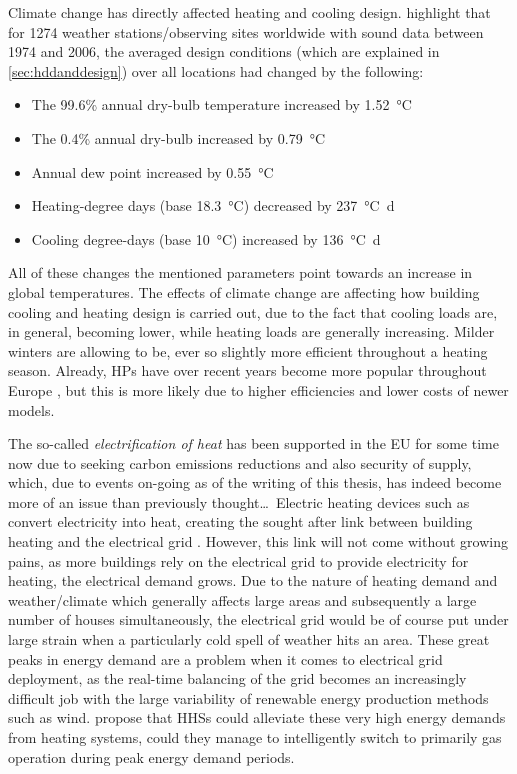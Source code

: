 Climate change has directly affected heating and cooling design.  highlight that for \num{1274} weather stations/observing sites worldwide with sound data between 1974 and 2006, the averaged design conditions (which are explained in \cref{sec:hddanddesign}) over all locations had changed by the following:
\begin{itemize}
    \item The 99.6\% annual dry-bulb temperature increased by \SI{1.52}{\celsius}
    \item The 0.4\% annual dry-bulb increased by \SI{0.79}{\celsius} 
    \item Annual dew point increased by \SI{0.55}{\celsius} 
    \item Heating-degree days (base \SI{18.3}{\celsius}) decreased by \SI{237}{\celsius\day} 
    \item Cooling degree-days (base \SI{10}{\celsius}) increased by \SI{136}{\celsius\day}
\end{itemize}
All of these changes the mentioned parameters point towards an increase in global temperatures. The effects of climate change are affecting how building cooling and heating design is carried out, due to the fact that cooling loads are, in general, becoming lower, while heating loads are generally increasing. Milder winters are allowing \HPs to be, ever so slightly more efficient throughout a heating season. Already, \acp{HP} have over recent years become more popular throughout Europe \cite{ehpa_2015,nowak_2018}, but this is more likely due to higher efficiencies and lower costs of newer models.


The so-called \textit{electrification of heat} has been supported in the EU for some time now due to seeking carbon emissions reductions and also security of supply, which, due to events on-going as of the writing of this thesis, has indeed become more of an issue than previously thought\ldots\ Electric heating devices such as \HPs convert electricity into heat, creating the sought after link between building heating and the electrical grid \cite{heinen_electricity_2016}. However, this link will not come without growing pains, as more buildings rely on the electrical grid to provide electricity for heating, the electrical demand grows. Due to the nature of heating demand and weather/climate which generally affects large areas and subsequently a large number of houses simultaneously, the electrical grid would be of course put under large strain when a particularly cold spell of weather hits an area. These great peaks in energy demand are a problem when it comes to electrical grid deployment, as the real-time balancing of the grid becomes an increasingly difficult job with the large variability of renewable energy production methods such as wind. \citeauthor {vuillecard_small_2011, thomasen_decarbonisation_2021} \cite{vuillecard_small_2011, thomasen_decarbonisation_2021} propose that \acp{HHS} could alleviate these very high energy demands from heating systems, could they manage to intelligently switch to primarily gas operation during peak energy demand periods. 


